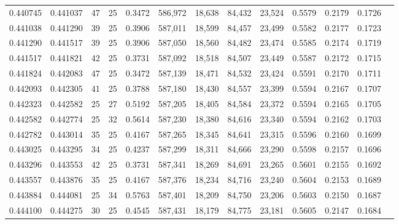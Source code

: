 \begin{tabular}{rrrrrrrrrrrrr}
0.440745 & 0.441037 &    47 &  25 &                                     0.3472 & 586,972 &  18,638 &  84,432 &  23,524 & 0.5579 & 0.2179 & 0.1726 \\
0.441038 & 0.441290 &    39 &  25 &                                     0.3906 & 587,011 &  18,599 &  84,457 &  23,499 & 0.5582 & 0.2177 & 0.1723 \\
0.441290 & 0.441517 &    39 &  25 &                                     0.3906 & 587,050 &  18,560 &  84,482 &  23,474 & 0.5585 & 0.2174 & 0.1719 \\
0.441517 & 0.441821 &    42 &  25 &                                     0.3731 & 587,092 &  18,518 &  84,507 &  23,449 & 0.5587 & 0.2172 & 0.1715 \\
0.441824 & 0.442083 &    47 &  25 &                                     0.3472 & 587,139 &  18,471 &  84,532 &  23,424 & 0.5591 & 0.2170 & 0.1711 \\
0.442093 & 0.442305 &    41 &  25 &                                     0.3788 & 587,180 &  18,430 &  84,557 &  23,399 & 0.5594 & 0.2167 & 0.1707 \\
0.442323 & 0.442582 &    25 &  27 &                                     0.5192 & 587,205 &  18,405 &  84,584 &  23,372 & 0.5594 & 0.2165 & 0.1705 \\
0.442582 & 0.442774 &    25 &  32 &                                     0.5614 & 587,230 &  18,380 &  84,616 &  23,340 & 0.5594 & 0.2162 & 0.1703 \\
0.442782 & 0.443014 &    35 &  25 &                                     0.4167 & 587,265 &  18,345 &  84,641 &  23,315 & 0.5596 & 0.2160 & 0.1699 \\
0.443025 & 0.443295 &    34 &  25 &                                     0.4237 & 587,299 &  18,311 &  84,666 &  23,290 & 0.5598 & 0.2157 & 0.1696 \\
0.443296 & 0.443553 &    42 &  25 &                                     0.3731 & 587,341 &  18,269 &  84,691 &  23,265 & 0.5601 & 0.2155 & 0.1692 \\
0.443557 & 0.443876 &    35 &  25 &                                     0.4167 & 587,376 &  18,234 &  84,716 &  23,240 & 0.5604 & 0.2153 & 0.1689 \\
0.443884 & 0.444081 &    25 &  34 &                                     0.5763 & 587,401 &  18,209 &  84,750 &  23,206 & 0.5603 & 0.2150 & 0.1687 \\
0.444100 & 0.444275 &    30 &  25 &                                     0.4545 & 587,431 &  18,179 &  84,775 &  23,181 & 0.5605 & 0.2147 & 0.1684 \\

\end{tabular}
